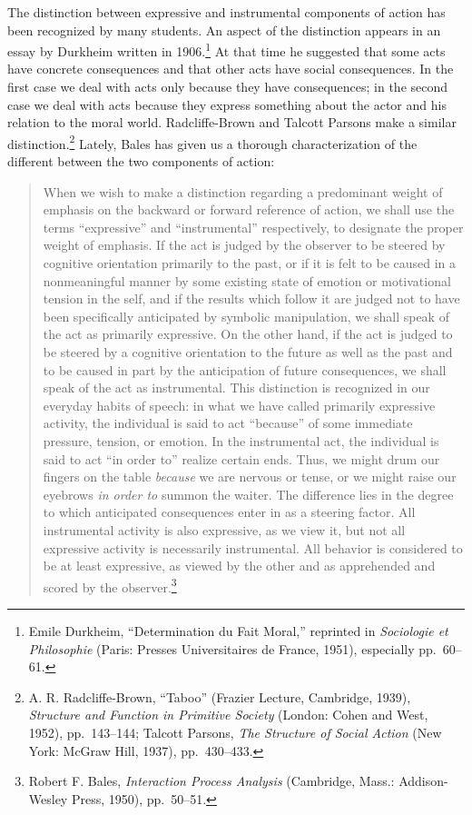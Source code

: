\documentclass[twoside,symmetric,nobib,justified]{tufte-book}
\begin{document}
The distinction between expressive and instrumental components of action
has been recognized by many students. An aspect of the distinction
appears in an essay by Durkheim written in 1906.\footnote{Emile
  Durkheim, ``Determination du Fait Moral,'' reprinted in
  \emph{Sociologie et Philosophie} (Paris: Presses Universitaires de
  France, 1951), especially pp.~60--61.} At that time he suggested that
some acts have concrete consequences and that other acts have social
consequences. In the first case we deal with acts only because they have
consequences; in the second case we deal with acts because they express
something about the actor and his relation to the moral world.
Radcliffe-Brown and Talcott Parsons make a similar
distinction.\footnote{A. R. Radcliffe-Brown, ``Taboo'' (Frazier Lecture,
  Cambridge, 1939), \emph{Structure and Function in Primitive Society}
  (London: Cohen and West, 1952), pp.~143--144; Talcott Parsons,
  \emph{The Structure of Social Action} (New York: McGraw Hill, 1937),
  pp.~430--433.} Lately, Bales has given us a thorough characterization
of the different between the two components of action:


\begin{quote}
When we wish to make a distinction regarding a predominant weight of
emphasis on the backward or forward reference of action, we shall use
the terms ``expressive'' and ``instrumental'' respectively, to designate
the proper weight of emphasis. If the act is judged by the observer to
be steered by cognitive orientation primarily to the past, or if it is
felt to be caused in a nonmeaningful manner by some existing state of
emotion or motivational tension in the self, and if the results which
follow it are judged not to have been specifically anticipated by
symbolic manipulation, we shall speak of the act as primarily
expressive. On the other hand, if the act is judged to be steered by a
cognitive orientation to the future as well as the past and to be caused
in part by the anticipation of future consequences, we shall speak of
the act as instrumental. This distinction is recognized in our everyday
habits of speech: in what we have called primarily expressive activity,
the individual is said to act ``because'' of some immediate pressure,
tension, or emotion. In the instrumental act, the individual is said to
act ``in order to'' realize certain ends. Thus, we might drum our
fingers on the table \emph{because} we are nervous or tense, or we might
raise our eyebrows \emph{in order to} summon the waiter. The difference
lies in the degree to which anticipated consequences enter in as a
steering factor. All instrumental activity is also expressive, as we
view it, but not all expressive activity is necessarily instrumental.
All behavior is considered to be at least expressive, as viewed by the
other and as apprehended and scored by the observer.\footnote{Robert F.
  Bales, \emph{Interaction Process Analysis} (Cambridge, Mass.:
  Addison-Wesley Press, 1950), pp.~50--51.}
\end{quote}
\end{document}
